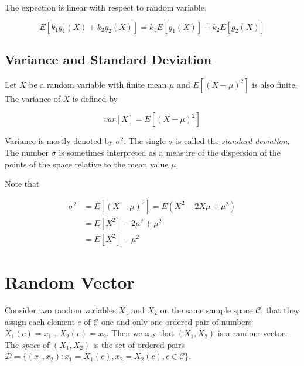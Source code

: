 \documentclass{article}
\begin{document}
            The expection is linear with respect to random variable,

            \begin{equation*}
                E [ k_{1} g_{1}(X) + k_{2} g_{2}(X) ] = k_{1} E [ g_{1}(X) ] + k_{2} E [ g_{2}(X) ]
            \end{equation*}

        \subsection*{Variance and Standard Deviation}

            Let $ X $ be a random variable with finite mean $ \mu $ and $ E [ (X -
            \mu)^{2} ] $ is also finite. The variance of $ X $ is defined by

            \begin{equation}
                var[ X ] = E [ (X - \mu)^{2} ]
            \end{equation}

            Variance is mostly denoted by $ \sigma^{2} $. The single $ \sigma $ is
            called the \textit{standard deviation}. The number $ \sigma $ is sometimes
            interpreted as a measure of the dispersion of the points of the space
            relative to the mean value $ \mu $.

            Note that

            \begin{align*}
                \sigma^2 &= E [ ( X - \mu )^{2} ] = E ( X^2 - 2 X \mu + \mu^{2} ) \\
                         &= E [ X^{2} ] - 2 \mu^{2} + \mu^{2} \\
                         &= E [ X^{2} ] - \mu^{2}
            \end{align*}

    \section*{Random Vector}

        Consider two random variables $ X_{1} $ and $ X_{2} $ on the same
        sample space $ \mathcal{C} $, that they assign each element $ c $ of $
        \mathcal{C} $ one and only one ordered pair of numbers $ X_{1}(c) =
        x_{1} $ , $ X_{2}(c) = x_{2} $. Then we say that $ (X_{1}, X_{2}) $ is
        a random vector. The \textit{space} of $ (X_{1}, X_{2}) $ is the set
        of ordered pairs $ \mathcal{D} =  \{ (x_{1}, x_{2}) : x_{1} = X_{1}(c),
        x_{2} = X_{2}(c), c \in \mathcal{C} \} $.
\end{document}
